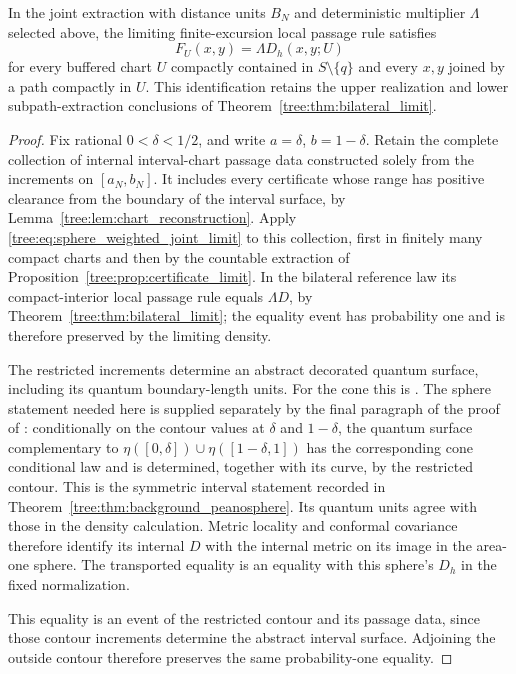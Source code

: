 \begin{lemma}\label{tree:lem:sphere_interior_metric}
In the joint extraction with distance units $B_N$ and deterministic
multiplier $\Lambda$ selected above, the limiting finite-excursion
local passage rule satisfies
\[
 F_U(x,y)=\Lambda D_h(x,y;U)
\]
for every buffered chart $U$ compactly contained in $S\setminus\{q\}$
and every $x,y$ joined by a path compactly in $U$. This identification
retains the upper realization and lower subpath-extraction conclusions
of Theorem~\ref{tree:thm:bilateral_limit}.
\end{lemma}
\begin{proof}
Fix rational $0<\delta<1/2$, and write
$a=\delta$, $b=1-\delta$. Retain the complete
collection of internal interval-chart passage data constructed solely
from the increments on $[a_N,b_N]$.  It includes every certificate whose
range has positive clearance from the boundary of the interval surface,
by Lemma~\ref{tree:lem:chart_reconstruction}.  Apply
\eqref{tree:eq:sphere_weighted_joint_limit} to this collection, first in
finitely many compact charts and then by the countable extraction of
Proposition~\ref{tree:prop:certificate_limit}.  In the bilateral reference
law its compact-interior local passage rule equals $\Lambda D$, by
Theorem~\ref{tree:thm:bilateral_limit}; the equality event has probability
one and is therefore preserved by the limiting density.

The restricted increments determine an abstract decorated quantum
surface, including its quantum boundary-length units. For the cone
this is \cite[Lemma~4.9]{GHSSurvey}. The sphere statement needed here
is supplied separately by the final paragraph of the proof of
\cite[Theorem~1.1, the case $\gamma\leq\sqrt2$, p.~49]{MillerSheffieldSphere}:
conditionally on the contour values at $\delta$ and $1-\delta$, the
quantum surface complementary to
$\eta([0,\delta])\cup\eta([1-\delta,1])$ has the corresponding cone
conditional law and is determined, together with its curve, by the
restricted contour. This is the symmetric interval statement recorded
in Theorem~\ref{tree:thm:background_peanosphere}. Its quantum units agree
with those in the density calculation. Metric locality and conformal
covariance therefore identify its internal $D$ with the internal metric
on its image in the area-one sphere. The transported equality is an
equality with this sphere's $D_h$ in the fixed normalization.

This equality is an event of the restricted contour and its passage
data, since those contour increments determine the abstract interval
surface. Adjoining the outside contour therefore preserves the same
probability-one equality.


\end{proof}

